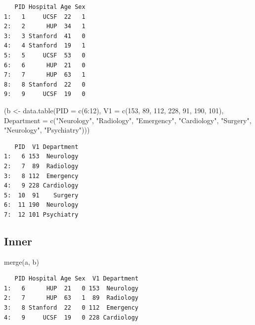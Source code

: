 \documentclass[
]{book}
\newenvironment{Shaded}{\begin{snugshade}}{\end{snugshade}}
\newcommand{\AttributeTok}[1]{\textcolor[rgb]{0.77,0.63,0.00}{#1}}
\newcommand{\DecValTok}[1]{\textcolor[rgb]{0.00,0.00,0.81}{#1}}
\newcommand{\FunctionTok}[1]{\textcolor[rgb]{0.00,0.00,0.00}{#1}}
\newcommand{\NormalTok}[1]{#1}
\newcommand{\OtherTok}[1]{\textcolor[rgb]{0.56,0.35,0.01}{#1}}
\newcommand{\SpecialCharTok}[1]{\textcolor[rgb]{0.00,0.00,0.00}{#1}}
\newcommand{\StringTok}[1]{\textcolor[rgb]{0.31,0.60,0.02}{#1}}
\begin{document}
\begin{verbatim}
   PID Hospital Age Sex
1:   1     UCSF  22   1
2:   2      HUP  34   1
3:   3 Stanford  41   0
4:   4 Stanford  19   1
5:   5     UCSF  53   0
6:   6      HUP  21   0
7:   7      HUP  63   1
8:   8 Stanford  22   0
9:   9     UCSF  19   0
\end{verbatim}

\begin{Shaded}
\begin{Highlighting}[]
\NormalTok{(b  }\OtherTok{\textless{}{-}} \FunctionTok{data.table}\NormalTok{(}\AttributeTok{PID =} \FunctionTok{c}\NormalTok{(}\DecValTok{6}\SpecialCharTok{:}\DecValTok{12}\NormalTok{),}
                  \AttributeTok{V1 =} \FunctionTok{c}\NormalTok{(}\DecValTok{153}\NormalTok{, }\DecValTok{89}\NormalTok{, }\DecValTok{112}\NormalTok{, }\DecValTok{228}\NormalTok{,  }\DecValTok{91}\NormalTok{, }\DecValTok{190}\NormalTok{, }\DecValTok{101}\NormalTok{),}
                  \AttributeTok{Department =} \FunctionTok{c}\NormalTok{(}\StringTok{"Neurology"}\NormalTok{, }\StringTok{"Radiology"}\NormalTok{, }\StringTok{"Emergency"}\NormalTok{,}
                                 \StringTok{"Cardiology"}\NormalTok{, }\StringTok{"Surgery"}\NormalTok{, }\StringTok{"Neurology"}\NormalTok{,}
                                 \StringTok{"Psychiatry"}\NormalTok{)))}
\end{Highlighting}
\end{Shaded}

\begin{verbatim}
   PID  V1 Department
1:   6 153  Neurology
2:   7  89  Radiology
3:   8 112  Emergency
4:   9 228 Cardiology
5:  10  91    Surgery
6:  11 190  Neurology
7:  12 101 Psychiatry
\end{verbatim}

\hypertarget{inner}{%
\subsection{Inner}\label{inner}}

\begin{Shaded}
\begin{Highlighting}[]
\FunctionTok{merge}\NormalTok{(a, b)}
\end{Highlighting}
\end{Shaded}

\begin{verbatim}
   PID Hospital Age Sex  V1 Department
1:   6      HUP  21   0 153  Neurology
2:   7      HUP  63   1  89  Radiology
3:   8 Stanford  22   0 112  Emergency
4:   9     UCSF  19   0 228 Cardiology
\end{verbatim}
\end{document}
